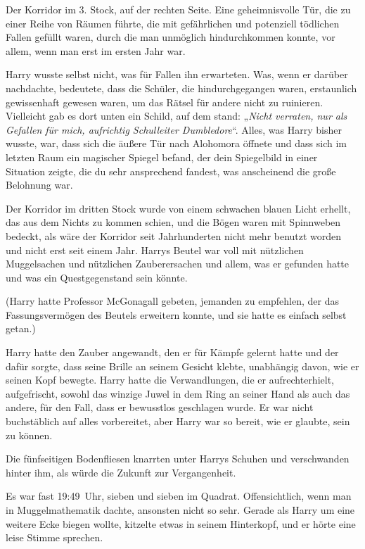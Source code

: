 {Der Korridor im 3. Stock, auf der rechten Seite. Eine geheimnisvolle Tür, die zu einer Reihe von Räumen führte, die mit gefährlichen und potenziell tödlichen Fallen gefüllt waren, durch die man unmöglich hindurchkommen konnte, vor allem, wenn man erst im ersten Jahr war.

Harry wusste selbst nicht, was für Fallen ihn erwarteten. Was, wenn er darüber nachdachte, bedeutete, dass die Schüler, die hindurchgegangen waren, erstaunlich gewissenhaft gewesen waren, um das Rätsel für andere nicht zu ruinieren. Vielleicht gab es dort unten ein Schild, auf dem stand: „\emph{Nicht verraten, nur als Gefallen für mich, aufrichtig Schulleiter Dumbledore}“. Alles, was Harry bisher wusste, war, dass sich die äußere Tür nach Alohomora öffnete und dass sich im letzten Raum ein magischer Spiegel befand, der dein Spiegelbild in einer Situation zeigte, die du sehr ansprechend fandest, was anscheinend die große Belohnung war.

Der Korridor im dritten Stock wurde von einem schwachen blauen Licht erhellt, das aus dem Nichts zu kommen schien, und die Bögen waren mit Spinnweben bedeckt, als wäre der Korridor seit Jahrhunderten nicht mehr benutzt worden und nicht erst seit einem Jahr. Harrys Beutel war voll mit nützlichen Muggelsachen und nützlichen Zauberersachen und allem, was er gefunden hatte und was ein Questgegenstand sein könnte.

(Harry hatte Professor McGonagall gebeten, jemanden zu empfehlen, der das Fassungsvermögen des Beutels erweitern konnte, und sie hatte es einfach selbst getan.)

Harry hatte den Zauber angewandt, den er für Kämpfe gelernt hatte und der dafür sorgte, dass seine Brille an seinem Gesicht klebte, unabhängig davon, wie er seinen Kopf bewegte. Harry hatte die Verwandlungen, die er aufrechterhielt, aufgefrischt, sowohl das winzige Juwel in dem Ring an seiner Hand als auch das andere, für den Fall, dass er bewusstlos geschlagen wurde. Er war nicht buchstäblich auf alles vorbereitet, aber Harry war so bereit, wie er glaubte, sein zu können.

Die fünfseitigen Bodenfliesen knarrten unter Harrys Schuhen und verschwanden hinter ihm, als würde die Zukunft zur Vergangenheit.

Es war fast 19:49~Uhr, sieben und sieben im Quadrat. Offensichtlich, wenn man in Muggelmathematik dachte, ansonsten nicht so sehr. Gerade als Harry um eine weitere Ecke biegen wollte, kitzelte etwas in seinem Hinterkopf, und er hörte eine leise Stimme sprechen.

}
